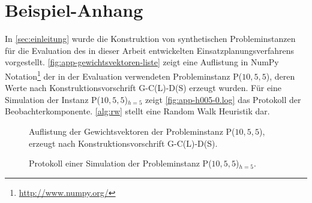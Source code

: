 %
\ifx\fulldocument\undefined
  
  \pagestyle{scrheadings}                                                         %
  \appendix
\fi
%
%
\chapter{Beispiel-Anhang}\label{app:example}
%
In \autoref{sec:einleitung} wurde die Konstruktion von synthetischen Probleminstanzen für die Evaluation des in dieser Arbeit entwickelten Einsatzplanungsverfahrens vorgestellt. \autoref{fig:app-gewichtsvektoren-liste} zeigt eine Auflistung in NumPy Notation\footnote{\url{http://www.numpy.org/}} der in der Evaluation verwendeten Probleminstanz \textsf{P($10,5,5$)}, deren Werte nach Konstruktionsvorschrift \textsf{G-C(L)-D(S)} erzeugt wurden. Für eine Simulation der Instanz \textsf{P($10,5,5$)$_{h=5}$} zeigt \autoref{fig:app-h005-0.log} das Protokoll der Beobachterkomponente. \autoref{alg:rw} stellt eine Random Walk Heuristik dar.
%
\begin{figure}
  \hspace{\fill}
  \begin{minipage}{0.35\textwidth}
    
  \end{minipage}
  \hspace{\fill}
  \begin{minipage}{0.35\textwidth}
    
  \end{minipage}
  \hspace{\fill}
  \caption[\textsf{P($10,5,5$)} (Gewichtsvektoren)]{Auflistung der Gewichtsvektoren der Probleminstanz \textsf{P($10,5,5$)}, erzeugt nach Konstruktionsvorschrift \textsf{G-C(L)-D(S)}.}
  \label{fig:app-gewichtsvektoren-liste}
\end{figure}
%
%
\begin{figure}
\centering
\begin{minipage}{\textwidth}
  
\end{minipage}
\caption[\textsf{P($10,5,5$)$_{h=5}$} (Simulationsprotokoll)]{Protokoll einer Simulation der Probleminstanz \textsf{P($10,5,5$)$_{h=5}$}.}
\label{fig:app-h005-0.log}
\end{figure}

